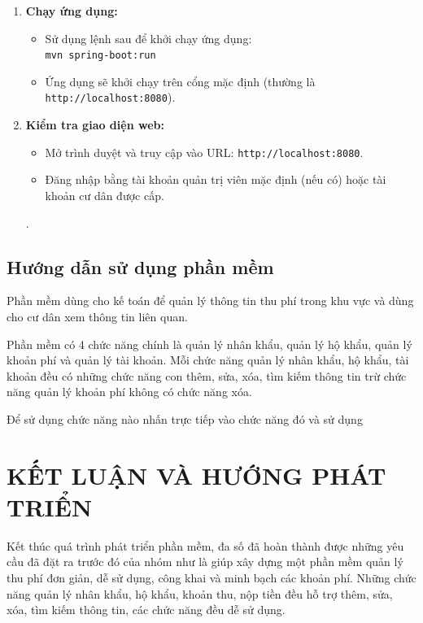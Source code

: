 \documentclass{article}
\begin{document}
\begin{enumerate}
        \item \textbf{Chạy ứng dụng:}
        \begin{itemize}
            \item Sử dụng lệnh sau để khởi chạy ứng dụng:\\\verb|mvn spring-boot:run |
            \item Ứng dụng sẽ khởi chạy trên cổng mặc định (thường là \verb|http://localhost:8080|).
        \end{itemize}
        \item \textbf{Kiểm tra giao diện web:}
        \begin{itemize}
            \item Mở trình duyệt và truy cập vào URL: \verb|http://localhost:8080|.
            \item Đăng nhập bằng tài khoản quản trị viên mặc định (nếu có) hoặc tài khoản cư dân được cấp.
        \end{itemize}.
    \end{enumerate}

\subsection{Hướng dẫn sử dụng phần mềm}
Phần mềm dùng cho kế toán để quản lý thông tin thu phí trong khu vực và dùng cho cư dân xem thông tin liên quan.

Phần mềm có 4 chức năng chính là quản lý nhân khẩu, quản lý hộ khẩu, quản lý khoản phí và quản lý tài khoản. Mỗi chức năng quản lý nhân khẩu, hộ khẩu, tài khoản đều có những chức năng con thêm, sửa, xóa, tìm kiếm thông tin trừ chức năng quản lý khoản phí không có chức năng xóa.

Để sử dụng chức năng nào nhấn trực tiếp vào chức năng đó và sử dụng
\newpage

\section*{KẾT LUẬN VÀ HƯỚNG PHÁT TRIỂN}
Kết thúc quá trình phát triển phần mềm, đa số đã hoàn thành được những yêu cầu đã đặt ra trước đó của nhóm như là giúp xây dựng một phần mềm quản lý thu phí đơn giản, dễ sử dụng, công khai và minh bạch các khoản phí. Những chức năng quản lý nhân khẩu, hộ khẩu, khoản thu, nộp tiền đều hỗ trợ thêm, sửa, xóa, tìm kiếm thông tin, các chức năng đều dễ sử dụng.
\end{document}

